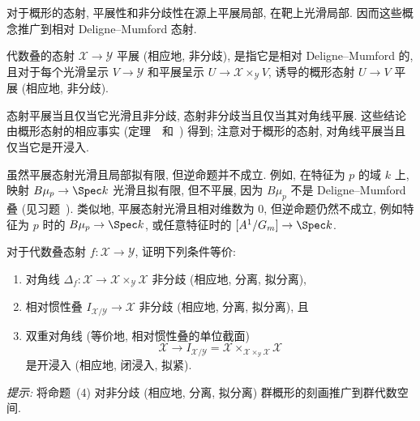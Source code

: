 对于概形的态射, 平展性和非分歧性在源上平展局部, 在靶上光滑局部. 因而这些概念推广到相对 Deligne--Mumford 态射.
\begin{definition}\label{src:4.3.37}
代数叠的态射 $\mathcal X\to\mathcal Y$ 平展 (相应地, 非分歧), 是指它是相对 Deligne--Mumford 的, 且对于每个光滑呈示 $V\to\mathcal Y$ 和平展呈示 $U\to\mathcal X\times_{\mathcal Y}V$, 诱导的概形态射 $U\to V$ 平展 (相应地, 非分歧).
\end{definition}
态射平展当且仅当它光滑且非分歧, 态射非分歧当且仅当其对角线平展. 这些结论由概形态射的相应事实 (定理~~和~) 得到; 注意对于概形的态射, 对角线平展当且仅当它是开浸入.

虽然平展态射光滑且局部拟有限, 但逆命题并不成立. 例如, 在特征为 $p$ 的域 $k$ 上, 映射 $B\mu_p\to\Spec k$ 光滑且拟有限, 但不平展, 因为 $B\mu_p$ 不是 Deligne--Mumford 叠 (见习题~). 类似地, 平展态射光滑且相对维数为 $0$, 但逆命题仍然不成立, 例如特征为 $p$ 时的 $B\mu_p\to\Spec k$, 或任意特征时的 $[\mathbb A^1/\mathbb G_m]\to\Spec k$.
\begin{exercise}[技术性]\label{src:4.3.38}
对于代数叠态射 $f:\mathcal X\to\mathcal Y$, 证明下列条件等价:
\begin{enumerate}[(1)]
\item 对角线 $\Delta_f:\mathcal X\to\mathcal X\times_{\mathcal Y}\mathcal X$ 非分歧 (相应地, 分离, 拟分离),
\item 相对惯性叠 $I_{\mathcal X/\mathcal Y}\to\mathcal X$ 非分歧 (相应地, 分离, 拟分离), 且
\item 双重对角线 (等价地, 相对惯性叠的单位截面)
\[
\mathcal X\longrightarrow I_{\mathcal X/\mathcal Y}
=\mathcal X\times_{\mathcal X\times_{\mathcal Y}\mathcal X}\mathcal X
\]
是开浸入 (相应地, 闭浸入, 拟紧).
\end{enumerate}
\emph{提示:} 将命题~(4) 对非分歧 (相应地, 分离, 拟分离) 群概形的刻画推广到群代数空间.
\end{exercise}
